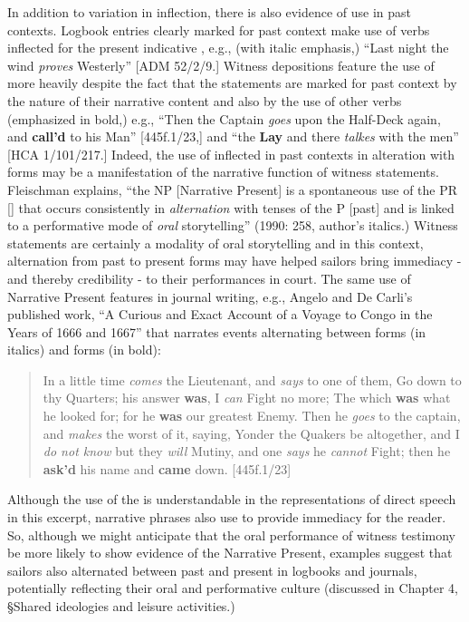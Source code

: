 In addition to variation in  inflection, there is also evidence of  use in past contexts. Logbook entries clearly marked for past context make use of verbs inflected for the present indicative , e.g., (with italic emphasis,) “Last night the wind \textit{proves} Westerly” [ADM 52/2/9.] Witness depositions feature the use of  more heavily despite the fact that the statements are marked for past context by the nature of their narrative content and also by the use of other  verbs (emphasized in bold,) e.g., “Then the Captain \textit{goes} upon the Half-Deck again, and \textbf{call’d} to his Man” [445f.1/23,] and “the  \textbf{Lay} and there \textit{talkes} with the men” [HCA 1/101/217.] Indeed, the use of inflected  in past contexts in alteration with  forms may be a manifestation of the narrative function of witness statements. Fleischman explains, “the NP [Narrative Present] is a spontaneous use of the PR [] that occurs consistently in \textit{alternation} with tenses of the P [past] and is linked to a performative mode of \textit{oral} storytelling” (1990: 258, author’s italics.) Witness statements are certainly a modality of oral storytelling and in this context, alternation from past to present forms may have helped sailors bring immediacy - and thereby credibility - to their performances in court. The same use of Narrative Present  features in journal writing, e.g., Angelo and De Carli’s published work, “A Curious and Exact Account of a Voyage to Congo in the Years of 1666 and 1667” that narrates events alternating between  forms (in italics) and  forms (in bold):

\begin{quotation}
In a little time \textit{comes} the Lieutenant, and \textit{says} to one of them, Go down to thy Quarters; his answer \textbf{was}, I \textit{can} Fight no more; The which \textbf{was} what he looked for; for he \textbf{was} our greatest Enemy. Then he \textit{goes} to the captain, and \textit{makes} the worst of it, saying, Yonder the Quakers be altogether, and I \textit{do not know} but they \textit{will} Mutiny, and one \textit{says} he \textit{cannot} Fight; then he \textbf{ask’d} his name and \textbf{came} down. [445f.1/23]\end{quotation}

Although the use of the  is understandable in the representations of direct speech in this excerpt, narrative phrases also use  to provide immediacy for the reader. So, although we might anticipate that the oral performance of witness testimony be more likely to show evidence of the Narrative Present, examples suggest that sailors also alternated between past and present in logbooks and journals, potentially reflecting their oral and performative culture (discussed in Chapter 4, §Shared ideologies and leisure activities.) 

